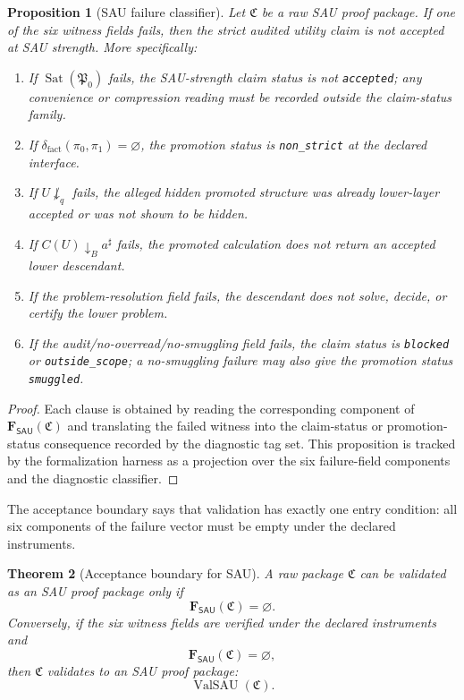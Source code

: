 \documentclass[11pt]{article}
\newcommand{\SAU}{\mathsf{SAU}}
\newtheorem{theorem}{Theorem}[section]
\newtheorem{proposition}[theorem]{Proposition}
\theoremstyle{definition}
\begin{document}
\begin{proposition}[SAU failure classifier]
\label{prop:sau-failure-classifier}
Let \(\mathfrak C\) be a raw SAU proof package.  If one of the six witness fields fails, then the strict audited utility claim is not accepted at SAU strength.  More specifically:
\begin{enumerate}
\item If \(\operatorname{Sat}(\mathfrak P_0)\) fails, the SAU-strength claim status is not \texttt{accepted}; any convenience or compression reading must be recorded outside the claim-status family.
\item If \(\delta_{\mathrm{fact}}(\pi_0,\pi_1)=\varnothing\), the promotion status is \texttt{non\_strict} at the declared interface.
\item If \(U\not\downarrow_q\) fails, the alleged hidden promoted structure was already lower-layer accepted or was not shown to be hidden.
\item If \(C(U)\downarrow_B a^\sharp\) fails, the promoted calculation does not return an accepted lower descendant.
\item If the problem-resolution field fails, the descendant does not solve, decide, or certify the lower problem.
\item If the audit/no-overread/no-smuggling field fails, the claim status is \texttt{blocked} or \texttt{outside\_scope}; a no-smuggling failure may also give the promotion status \texttt{smuggled}.
\end{enumerate}
\end{proposition}

\begin{proof}
Each clause is obtained by reading the corresponding component of
\(\mathbf F_{\SAU}(\mathfrak C)\) and translating the failed witness into the
claim-status or promotion-status consequence recorded by the diagnostic tag
set.  This proposition is tracked by the formalization harness as a projection
over the six failure-field components and the diagnostic classifier.
\end{proof}

The acceptance boundary says that validation has exactly one entry condition:
all six components of the failure vector must be empty under the declared
instruments.

\begin{theorem}[Acceptance boundary for SAU]
\label{thm:sau-acceptance-boundary}
A raw package \(\mathfrak C\) can be validated as an SAU proof package only if
\[
\mathbf F_{\SAU}(\mathfrak C)=\varnothing.
\]
Conversely, if the six witness fields are verified under the declared instruments and
\[
\mathbf F_{\SAU}(\mathfrak C)=\varnothing,
\]
then \(\mathfrak C\) validates to an SAU proof package:
\[
\operatorname{ValSAU}(\mathfrak C).
\]
\end{theorem}
\end{document}
